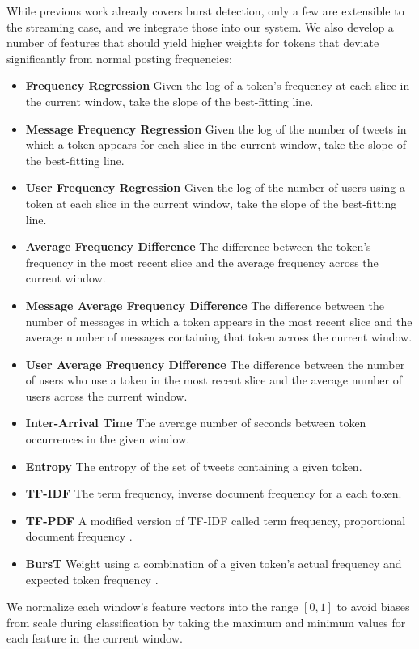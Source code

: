 \documentclass{sig-alternate}
\begin{document}
While previous work already covers burst detection, only a few are extensible to the streaming case, and we integrate those into our system.
We also develop a number of features that should yield higher weights for tokens that deviate significantly from normal posting frequencies:

\begin{itemize}
\item \textbf{Frequency Regression} Given the log of a token's frequency at each slice in the current window, take the slope of the best-fitting line.
\item \textbf{Message Frequency Regression} Given the log of the number of tweets in which a token appears for each slice in the current window, take the slope of the best-fitting line.
\item \textbf{User Frequency Regression} Given the log of the number of users using a token at each slice in the current window, take the slope of the best-fitting line.
\item \textbf{Average Frequency Difference} The difference between the token's frequency in the most recent slice and the average frequency across the current window.
\item \textbf{Message Average Frequency Difference} The difference between the number of messages in which a token appears in the most recent slice and the average number of messages containing that token across the current window.
\item \textbf{User Average Frequency Difference} The difference between the number of users who use a token in the most recent slice and the average number of users across the current window.
\item \textbf{Inter-Arrival Time} The average number of seconds between token occurrences in the given window.
\item \textbf{Entropy} The entropy of the set of tweets containing a given token.
\item \textbf{TF-IDF} The term frequency, inverse document frequency for a each token.
\item \textbf{TF-PDF} A modified version of TF-IDF called term frequency, proportional document frequency \cite{Bun:2002:TEN:645962.674082}.
\item \textbf{BursT} Weight using a combination of a given token's actual frequency and expected token frequency \cite{Lee:2011:BDT:2009463.2009531}.
\end{itemize}

We normalize each window's feature vectors into the range $[0, 1]$ to avoid biases from scale during classification by taking the maximum and minimum values for each feature in the current window.
\end{document}
